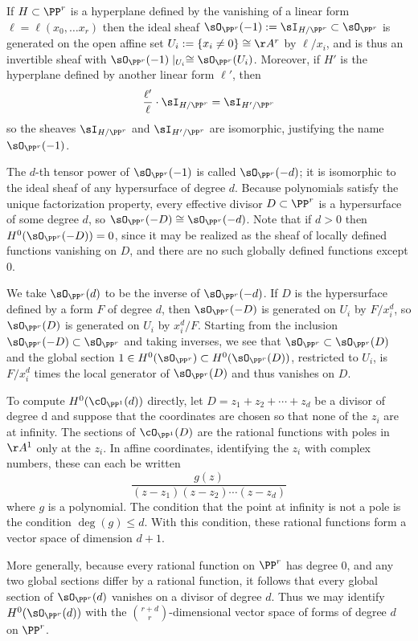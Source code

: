 \begin{example} \label{linear series on Pr} If $H\subset \PP^{r}$ is a hyperplane defined by the vanishing of a linear form $\ell = \ell(x_{0}, \dots x_{r})$ then the ideal sheaf $\sO_{\PP^{r}}(-1) := \sI_{H/\PP^{r}}\subset \sO_{\PP^{r}}$ is generated on the open affine set 
$U_{i}:= \{x_{i}\neq 0\} \cong \AA^{r}$
by $\ell/x_{i}$, and is thus an invertible sheaf with $\sO_{\PP^{r}}(-1)\mid_{U_i} \cong \sO_{\PP^{r}}(U_i)$.
Moreover, if $H'$ is the hyperplane defined by another linear form $\ell'$, then 
$$
\frac{\ell'}{\ell}\cdot\sI_{H/\PP^{r}} = \sI_{H'/\PP^{r}} 
$$
so the sheaves $\sI_{H/\PP^{r}}$ and $\sI_{H'/\PP^{r}} $ are isomorphic, justifying the name $\sO_{\PP^{r}}(-1)$.

The $d$-th tensor power of $\sO_{\PP^{r}}(-1)$ is called $\sO_{\PP^{r}}(-d)$; it is isomorphic to the
ideal sheaf of any hypersurface of degree $d$. Because polynomials satisfy the unique factorization property,
every effective divisor $D\subset \PP^{r}$ is a hypersurface of some degree $d$, so
$\sO_{\PP^{r}}(-D) \cong \sO_{\PP^{r}}(-d)$. Note that if $d>0$ then $H^{0}(\sO_{\PP^{r}}(-D)) = 0$, since it may be realized
as the sheaf of locally defined functions vanishing on $D$, and there are no such
globally defined functions except 0.

We take $\sO_{\PP^{r}}(d)$ to be the inverse of $\sO_{\PP^{r}}(-d)$. If $D$ is the hypersurface defined by 
a form $F$ of degree $d$, then $\sO_{\PP^{r}}(-D)$ is generated on $U_{i}$ by $F/x_{i}^{d}$, so
$\sO_{\PP^{r}}(D)$ is generated on $U_{i}$ by $x_{i}^{d}/F$.
Starting from the inclusion 
$
\sO_{\PP^{r}}(-D) \subset \sO_{\PP^{r}}
$
and taking inverses, we see that 
$
\sO_{\PP^{r}} \subset \sO_{\PP^{r}}(D)
$
and the global section $1\in H^0(\sO_{\PP^{r}})\subset H^0(\sO_{\PP^{r}}(D))$, restricted to
$U_{i}$, is $F/x_{i}^{d}$ times the local generator of $\sO_{\PP^{r}}(D)$ and thus vanishes on $D$.
 
To compute $H^0(\cO_{\PP^1} (d))$ directly, let $D = z_1 +z_2 +\cdots+z_d$ be a divisor of degree d and suppose that the coordinates are chosen so that none of the $z_i$ are at infinity. The sections of $\cO_{\PP^1} (D)$ are the rational functions with poles in $\AA^1$ only at 
the $z_i$. In affine coordinates, identifying the $z_i$ with complex numbers, these can each be written
$$
\frac{g(z)}{(z-z_1)(z-z_2)\cdots(z-z_d)}
$$
where $g$ is a polynomial. The condition that the point at infinity is not a pole is the condition $\deg(g) \leq d$. With this condition, these rational functions form a vector space of dimension $d+1$.

More generally, because every
rational function on $\PP^{r}$ has degree 0, and any two global sections differ by a rational
function, it follows that every global section of $\sO_{\PP^{r}}(d)$ vanishes on a divisor of degree $d$. Thus
we may identify $H^{0}(\sO_{\PP^{r}}(d))$ with the ${r+d\choose r}$-dimensional vector space of forms of degree $d$ on $\PP^{r}$.
\end{example}

